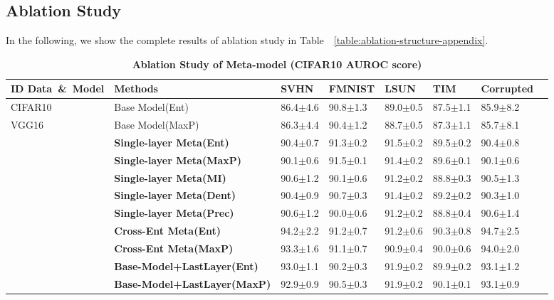 \subsection{Ablation Study}
In the following, we show the complete results of ablation study in Table~~\ref{table:ablation-structure-appendix}.
\begin{table}[!t]
  \begin{center}
  \scriptsize
  \captionsetup{font=small}
  \caption{\textbf{Ablation Study of Meta-model (CIFAR10 AUROC score)}}
  \vspace{-1.5em}
  \begin{tabular}{llllllll}
    \\
    \toprule
    \textbf{ID Data}\ \&\ \textbf{Model} & \textbf{Methods} & \textbf{SVHN}& \textbf{FMNIST} & \textbf{LSUN}& \textbf{TIM} &\textbf{Corrupted} \\
    \hline
    CIFAR10 & Base Model(Ent)  & 86.4$\pm$4.6 & 90.8$\pm$1.3 & 89.0$\pm$0.5 & 87.5$\pm$1.1 & 85.9$\pm$8.2  \\
    VGG16   & Base Model(MaxP)  & 86.3$\pm$4.4 & 90.4$\pm$1.2 & 88.7$\pm$0.5 & 87.3$\pm$1.1 & 85.7$\pm$8.1   \\
    \hline
            & \textbf{Single-layer Meta(Ent)}  & 90.4$\pm$0.7 & 91.3$\pm$0.2 & 91.5$\pm$0.2 & 89.5$\pm$0.2 & 90.4$\pm$0.8 \\
            & \textbf{Single-layer Meta(MaxP)}  & 90.1$\pm$0.6 & 91.5$\pm$0.1 & 91.4$\pm$0.2 & 89.6$\pm$0.1 & 90.1$\pm$0.6 \\
            & \textbf{Single-layer Meta(MI)}  & 90.6$\pm$1.2 & 90.1$\pm$0.6 & 91.2$\pm$0.2 & 88.8$\pm$0.3 & 90.5$\pm$1.3 \\
            & \textbf{Single-layer Meta(Dent)}  & 90.4$\pm$0.9 & 90.7$\pm$0.3 & 91.4$\pm$0.2 & 89.2$\pm$0.2 & 90.3$\pm$1.0 \\
            & \textbf{Single-layer Meta(Prec)} & 90.6$\pm$1.2 & 90.0$\pm$0.6 & 91.2$\pm$0.2 & 88.8$\pm$0.4 & 90.6$\pm$1.4 \\
    \hline
      & \textbf{Cross-Ent Meta(Ent)}  & 94.2$\pm$2.2 & 91.2$\pm$0.7 & 91.2$\pm$0.6 &  90.3$\pm$0.8& 94.7$\pm$2.5 \\
        & \textbf{Cross-Ent Meta(MaxP)}  & 93.3$\pm$1.6 & 91.1$\pm$0.7 &90.9$\pm$0.4 &  90.0$\pm$0.6 & 94.0$\pm$2.0 \\
    \hline
       & \textbf{Base-Model+LastLayer(Ent)}& 93.0$\pm$1.1 & 90.2$\pm$0.3 & 91.9$\pm$0.2 &  89.9$\pm$0.2& 93.1$\pm$1.2 \\
        &\textbf{Base-Model+LastLayer(MaxP)} & 92.9$\pm$0.9 & 90.5$\pm$0.3 &91.9$\pm$0.2 &  90.1$\pm$0.1 & 93.1$\pm$0.9 \\

\end{tabular}
\end{center}
\end{table}
